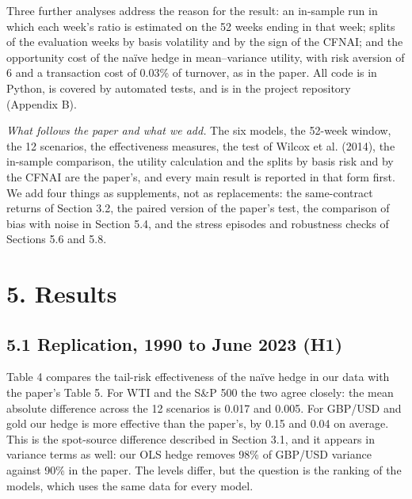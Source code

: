 \documentclass[11pt,letterpaper]{article}
\begin{document}
Three further analyses address the reason for the result: an in-sample run in which each week's ratio is estimated on the 52 weeks ending in that week; splits of the evaluation weeks by basis volatility and by the sign of the CFNAI; and the opportunity cost of the naïve hedge in mean–variance utility, with risk aversion of 6 and a transaction cost of 0.03\% of turnover, as in the paper. All code is in Python, is covered by automated tests, and is in the project repository (Appendix B).

\textit{What follows the paper and what we add.} The six models, the 52-week window, the 12 scenarios, the effectiveness measures, the test of Wilcox et al. (2014), the in-sample comparison, the utility calculation and the splits by basis risk and by the CFNAI are the paper's, and every main result is reported in that form first. We add four things as supplements, not as replacements: the same-contract returns of Section 3.2, the paired version of the paper's test, the comparison of bias with noise in Section 5.4, and the stress episodes and robustness checks of Sections 5.6 and 5.8.

\section*{5. Results}

\subsection*{5.1 Replication, 1990 to June 2023 (H1)}

Table 4 compares the tail-risk effectiveness of the naïve hedge in our data with the paper's Table 5. For WTI and the S\&P 500 the two agree closely: the mean absolute difference across the 12 scenarios is 0.017 and 0.005. For GBP/USD and gold our hedge is more effective than the paper's, by 0.15 and 0.04 on average. This is the spot-source difference described in Section 3.1, and it appears in variance terms as well: our OLS hedge removes 98\% of GBP/USD variance against 90\% in the paper. The levels differ, but the question is the ranking of the models, which uses the same data for every model.
\end{document}
